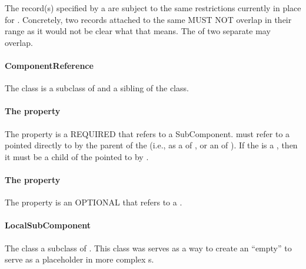 The  record(s) specified by a  are subject to the same restrictions currently in place for  . Concretely, two  records attached to the same  MUST NOT overlap in their range as it would not be clear what that means. The  of two separate  may overlap.



\paragraph{ComponentReference}
\label{sec:ComponentReference}

The  class is a subclass of  and a sibling of the  class. 


\paragraph{The  property}\label{sec:inChildOf}

The  property is a REQUIRED  that refers to a SubComponent.  must refer to a  pointed directly to by the parent of the  (i.e., as a  of , or an  of ). If the  is a , then it must be a child of the  pointed to by .

\paragraph{The  property}\label{sec:feature:CR}

The  property is an OPTIONAL  that refers to a .

\paragraph{LocalSubComponent}
\label{sec:LocalSubComponent}

The  class a subclass of . This class was serves as a way to create an ``empty''  to serve as a placeholder in more complex s. 


